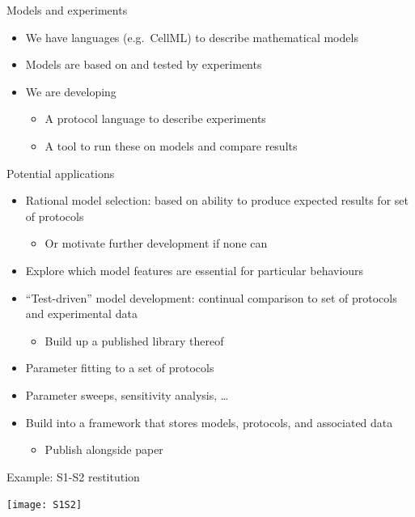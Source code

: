 \documentclass[t,xcolor={usenames,dvipsnames}]{beamer}
\newcommand{\subitem}[1]{\begin{itemize}[<.->]\item #1 \end{itemize}}
\begin{document}
\begin{frame}{Models and experiments}
\begin{itemize}
\item We have languages (e.g.\ CellML) to describe mathematical models
\item Models are based on and tested by \alert{experiments}
\item We are developing
  \begin{itemize}
  \item A \alert{protocol language} to describe experiments
  \item A tool to run these on models and compare results
  \end{itemize}
\end{itemize}
\end{frame}

\begin{frame}{Potential applications}
\begin{itemize}
\item Rational model selection: based on ability to produce expected results for set of protocols
  \subitem{Or motivate further development if none can}
\item Explore which model features are essential for particular behaviours
\item ``Test-driven'' model development: continual comparison to set of protocols and experimental data
  \subitem{Build up a published library thereof}
\item Parameter fitting to a set of protocols
\item Parameter sweeps, sensitivity analysis, \ldots
\item Build into a framework that stores models, protocols, and associated data
  \subitem{Publish alongside paper}
\end{itemize}
\end{frame}

\begin{frame}{Example: S1-S2 restitution}
\begin{center}
\texttt{[image: S1S2]}
\end{center}
\end{frame}
\end{document}
